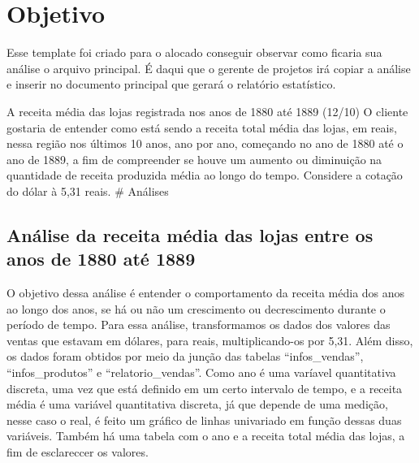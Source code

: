 \documentclass[
]{estat/estat}
\author{}
\date{}
\let\oldsection\section
\renewcommand\section{\clearpage\oldsection}
\renewcommand*\contentsname{Índice}
\newcommand\contentsname{Índice}
\begin{document}
\fancyhf{} 

\fancyhead[L]{} %
\renewcommand{\headrulewidth}{0pt}   %

\fancyfoot[R]{\textcolor{white}{\thepage}} %

\pagestyle{fancy} 



\renewcommand*\contentsname{Sumário}
{
\hypersetup{linkcolor=}
\setcounter{tocdepth}{3}
\tableofcontents
}

\section{Objetivo}\label{objetivo}

Esse template foi criado para o alocado conseguir observar como ficaria
sua análise o arquivo principal. É daqui que o gerente de projetos irá
copiar a análise e inserir no documento principal que gerará o relatório
estatístico.

A receita média das lojas registrada nos anos de 1880 até 1889 (12/10) O
cliente gostaria de entender como está sendo a receita total média das
lojas, em reais, nessa região nos últimos 10 anos, ano por ano,
começando no ano de 1880 até o ano de 1889, a fim de compreender se
houve um aumento ou diminuição na quantidade de receita produzida média
ao longo do tempo. Considere a cotação do dólar à 5,31 reais. \#
Análises

\subsection{Análise da receita média das lojas entre os anos de 1880 até
1889}\label{anuxe1lise-da-receita-muxe9dia-das-lojas-entre-os-anos-de-1880-atuxe9-1889}

O objetivo dessa análise é entender o comportamento da receita média dos
anos ao longo dos anos, se há ou não um crescimento ou decrescimento
durante o período de tempo. Para essa análise, transformamos os dados
dos valores das ventas que estavam em dólares, para reais,
multiplicando-os por 5,31. Além disso, os dados foram obtidos por meio
da junção das tabelas ``infos\_vendas'', ``infos\_produtos'' e
``relatorio\_vendas''. Como ano é uma varíavel quantitativa discreta,
uma vez que está definido em um certo intervalo de tempo, e a receita
média é uma variável quantitativa discreta, já que depende de uma
medição, nesse caso o real, é feito um gráfico de linhas univariado em
função dessas duas variáveis. Também há uma tabela com o ano e a receita
total média das lojas, a fim de esclareccer os valores.
\end{document}
